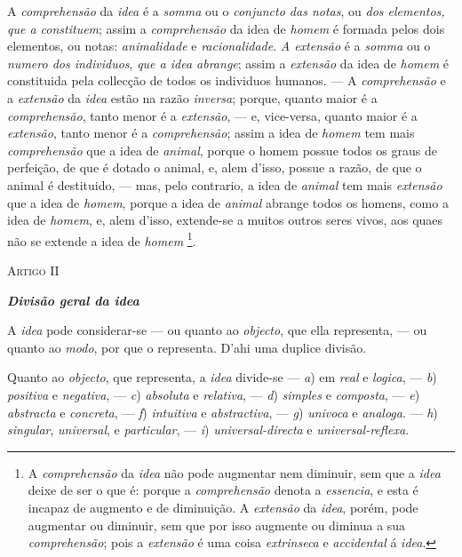  
A \emph{comprehensão} da \emph{idea} é a \emph{somma} ou o \emph{conjuncto das notas}, ou \emph{dos elementos, que a constituem}; assim a \emph{comprehensão} da idea de \emph{homem} é formada pelos dois elementos, ou notas: \emph{animalidade} e \emph{racionalidade}. \emph{A extensão} é a \emph{somma} ou o \emph{numero dos individuos}, \emph{que a idea abrange}; assim a \emph{extensão} da idea de \emph{homem} é constituida pela collecção de todos os individuos humanos. --- A \emph{comprehensão} e a \emph{extensão} da \emph{idea} estão na razão \emph{inversa}; porque, quanto maior é a \emph{comprehensão}, tanto menor é a \emph{extensão}, --- e, vice-versa, quanto maior é a \emph{extensão}, tanto menor é a \emph{comprehensão}; assim a idea de \emph{homem} tem mais \emph{comprehensão} que a idea de \emph{animal}, porque o homem possue todos os graus de perfeição, de que é dotado o animal, e, alem d'isso, possue a razão, de que o animal é destituido, --- mas, pelo contrario, a idea de \emph{animal} tem mais \emph{extensão} que a idea de \emph{homem}, porque a idea de \emph{animal} abrange todos os homens, como a idea de \emph{homem}, e, alem d'isso, extende-se a muitos outros seres vivos, aos quaes não se extende a idea de \emph{homem} \footnote{A \emph{comprehensão} da \emph{idea} não pode augmentar nem diminuir, sem que a \emph{idea} deixe de ser o que é: porque a \emph{comprehensão} denota a \emph{essencia}, e esta é incapaz de augmento e de diminuição. A \emph{extensão} da \emph{idea}, porém, pode augmentar ou diminuir, sem que por isso augmente ou diminua a sua \emph{comprehensão}; pois a \emph{extensão} é uma coisa \emph{extrinseca} e \emph{accidental} á \emph{idea}.}.

\textsc{Artigo II}

\emph{\textbf{Divisão geral da idea}}


A \emph{idea} pode considerar-se --- ou quanto ao \emph{objecto}, que ella representa, --- ou quanto ao \emph{modo}, por que o representa. D'ahi uma duplice divisão.


Quanto ao \emph{objecto}, que representa, a \emph{idea} divide-se --- \emph{a}) em \emph{real} e \emph{logica}, --- \emph{b}) \emph{positiva} e \emph{negativa}, --- \emph{c}) \emph{absoluta} e \emph{relativa}, ---   \emph{d}) \emph{simples} e \emph{composta}, --- \emph{e}) \emph{abstracta} e \emph{concreta}, --- \emph{f}) \emph{intuitiva} e \emph{abstractiva}, --- \emph{g}) \emph{univoca} e \emph{analoga}. --- \emph{h}) \emph{singular}, \emph{universal}, e \emph{particular}, --- \emph{i}) \emph{universal-directa} e \emph{universal-reflexa}.

